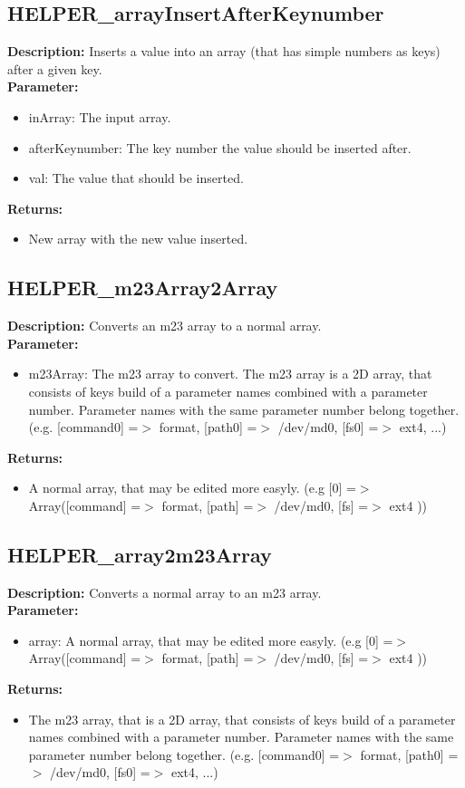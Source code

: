 \subsection{HELPER\_arrayInsertAfterKeynumber}
\textbf{Description:} Inserts a value into an array (that has simple numbers as keys) after a given key.\\
\textbf{Parameter:}
\begin{itemize}
\item inArray: The input array.
\item afterKeynumber: The key number the value should be inserted after.
\item val: The value that should be inserted.
\end{itemize}
\textbf{Returns:}
\begin{itemize}
\item New array with the new value inserted.
\end{itemize}

\subsection{HELPER\_m23Array2Array}
\textbf{Description:} Converts an m23 array to a normal array.\\
\textbf{Parameter:}
\begin{itemize}
\item m23Array: The m23 array to convert. The m23 array is a 2D array, that consists of keys build of a parameter names combined with a parameter number. Parameter names with the same parameter number belong together. (e.g. [command0] =$>$ format, [path0] =$>$ /dev/md0, [fs0] =$>$ ext4, ...)
\end{itemize}
\textbf{Returns:}
\begin{itemize}
\item A normal array, that may be edited more easyly. (e.g [0] =$>$ Array([command] =$>$ format, [path] =$>$ /dev/md0, [fs] =$>$ ext4 ))
\end{itemize}

\subsection{HELPER\_array2m23Array}
\textbf{Description:} Converts a normal array to an m23 array.\\
\textbf{Parameter:}
\begin{itemize}
\item array: A normal array, that may be edited more easyly. (e.g [0] =$>$ Array([command] =$>$ format, [path] =$>$ /dev/md0, [fs] =$>$ ext4 ))
\end{itemize}
\textbf{Returns:}
\begin{itemize}
\item The m23 array, that is a 2D array, that consists of keys build of a parameter names combined with a parameter number. Parameter names with the same parameter number belong together. (e.g. [command0] =$>$ format, [path0] =$>$ /dev/md0, [fs0] =$>$ ext4, ...)
\end{itemize}

